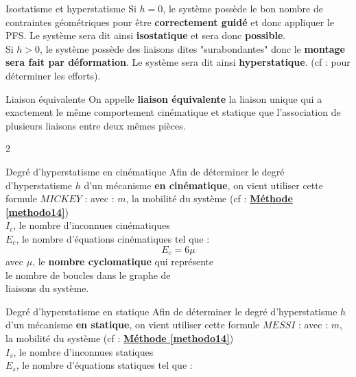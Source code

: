 \documentclass{article} %
\begin{document}
{\begin{definition}{Isostatisme et hyperstatisme}
Si $h=0$, le système possède le bon nombre de contraintes géométriques pour être \textbf{correctement guidé} et donc appliquer le PFS. Le système sera dit ainsi \textbf{isostatique} et sera donc \textbf{possible}.\\
Si $h>0$, le système possède des liaisons dites "surabondantes" donc le \textbf{montage sera fait par déformation}. Le système sera dit ainsi \textbf{hyperstatique}. (cf :  pour déterminer les efforts).
\end{definition}
\begin{definition}[label=def45]{Liaison équivalente}
On appelle \textbf{liaison équivalente} la liaison unique qui a exactement le même comportement cinématique et statique que l'association de plusieurs liaisons entre deux mêmes pièces.
\end{definition}
\begin{multicols}{2}
\begin{propriété}{Degré d'hyperstatisme en cinématique}
Afin de déterminer le degré d'hyperstatisme $h$ d'un mécanisme \textbf{en cinématique}, on vient utiliser cette formule $MICKEY$ :
avec : $m$, la mobilité du système (cf : \hyperref[methodo14]{\textcolor{myorange}{\textbf{Méthode \ref*{methodo14}}}})\\
\hspace*{23pt} $I_c$, le nombre d'inconnues cinématiques\\
\hspace*{22pt} $E_c$, le nombre d'équations cinématiques tel que :
$$E_c=6\mu$$
\hspace*{22pt} avec $\mu$, le \textbf{nombre cyclomatique} qui représente\\
\hspace*{22pt} le nombre de boucles dans le graphe de\\
\hspace*{22pt} liaisons du système.
\end{propriété}
\begin{propriété}{Degré d'hyperstatisme en statique}
Afin de déterminer le degré d'hyperstatisme $h$ d'un mécanisme \textbf{en statique}, on vient utiliser cette formule $MESSI$ :
avec : $m$, la mobilité du système (cf : \hyperref[methodo14]{\textcolor{myorange}{\textbf{Méthode \ref*{methodo14}}}})\\
\hspace*{23pt} $I_s$, le nombre d'inconnues statiques\\
\hspace*{22pt} $E_s$, le nombre d'équations statiques tel que :

\end{propriété}
\end{multicols}}
\end{document}
